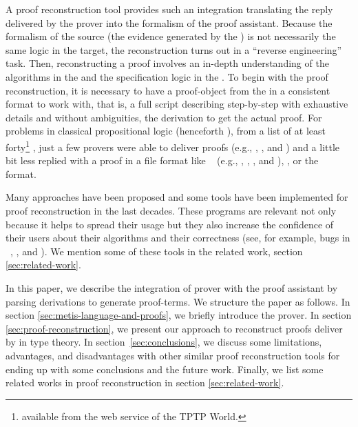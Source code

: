 \documentclass[../main.tex]{subfiles}
\begin{document}
A proof reconstruction tool provides such an integration translating
the reply delivered by the prover into the formalism of the proof
assistant. Because the formalism of the source (the evidence
generated by the \ATP) is not necessarily the same logic in the
target, the reconstruction turns out in a ``reverse engineering''
task. Then, reconstructing a proof involves an in-depth
understanding of the algorithms in the \ATP and the specification
logic in the \ITP. To begin with the proof reconstruction, it is
necessary to have a proof-object from the \ATP in a consistent
format to work with, that is, a full script describing step-by-step
with exhaustive details and without ambiguities, the derivation to
get the actual proof.
For problems in classical propositional logic (henceforth \CPL),
from a list of at least forty\footnote{\ATPs available from the web
service  of the TPTP World.} \ATPs, just a few
provers were able to deliver proofs (e.g., 
\cite{Barrett2011}, , and 
\cite{hillenbrand1997}) and a little bit less replied with a proof
in a file format like \TSTP~\cite{sutcliffe2004tstp} (e.g.,
, \Metis, , and ), 
\cite{Stump2008}, or the ~\cite{Bohme2011} format.

Many approaches have been proposed and some tools have been
implemented for proof reconstruction in the last decades. These
programs are relevant not only because it helps to spread their
usage but they also increase the confidence of their users about
their algorithms and their correctness (see, for example, bugs in
\ATPs~\cite{Keller2013}, \cite{Bohme2011}, \cite{Fleury2014} and
\cite{Kanso2012}). We mention some of these tools in the related work,
section \ref{sec:related-work}.

In this paper, we describe the integration of \Metis prover with the
proof assistant \Agda by parsing \TSTP derivations to generate \Agda
proof-terms. We structure the paper as follows. In section
\ref{sec:metis-language-and-proofs}, we briefly introduce the \Metis
prover. In section \ref{sec:proof-reconstruction}, we present our
approach to reconstruct proofs deliver by \Metis in type theory.
In section~\ref{sec:conclusions}, we discuss
some limitations, advantages, and disadvantages with other similar
proof reconstruction tools for ending up with some conclusions and 
the future work. Finally, we list some related works in proof 
reconstruction in section \ref{sec:related-work}.
\end{document}
